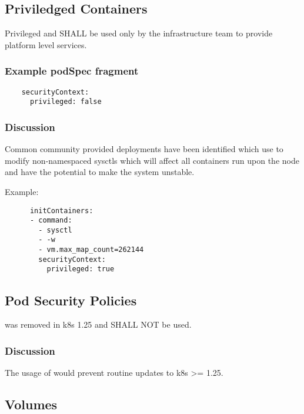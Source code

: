 \documentclass[PMO,authoryear,toc]{lsstdoc}
\begin{document}
\subsection{Priviledged Containers}\label{sec:priviledged}

Privileged  and  SHALL be used only by the infrastructure team to provide platform level services.

\subsubsection{Example podSpec fragment}

\begin{verbatim}
    securityContext:
      privileged: false
\end{verbatim}

\subsubsection{Discussion}

Common community provided deployments have been identified which use  to modify non-namespaced sysctls which will affect all containers run upon the node and have the potential to make the system unstable.

Example:

\begin{verbatim}
      initContainers:
      - command:
        - sysctl
        - -w
        - vm.max_map_count=262144
        securityContext:
          privileged: true
\end{verbatim}

\subsection{Pod Security Policies}

 was removed in k8s 1.25 and SHALL NOT be used.

\subsubsection{Discussion}

The usage of  would prevent routine updates to k8s >= 1.25.

\subsection{ Volumes}\label{sec:hostpath}
\end{document}
